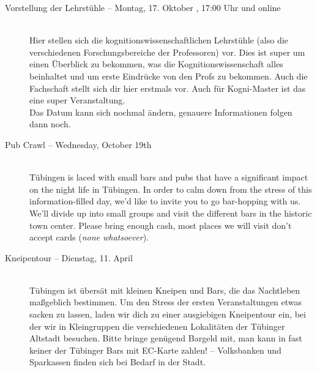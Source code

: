 \begin{description}

\ifkogwiss
	\item[Vorstellung der Lehrstühle -- Montag, 17. Oktober \YEAR, 17:00 Uhr und online]\ \\
	Hier stellen sich die kognitionswissenschaftlichen Lehrstühle (also die verschiedenen Forschungsbereiche der Professoren) vor. Dies ist super um einen Überblick zu bekommen, was die Kognitionswissenschaft alles beinhaltet und um erste Eindrücke von den Profs zu bekommen. Auch die Fachschaft stellt sich dir hier erstmals vor. %
	Auch für Kogni-Master ist das eine super Veranstaltung. \\
	Das Datum kann sich nochmal ändern, genauere Informationen folgen dann noch.
\fi

\ifml
	\item[Pub Crawl -- Wednesday, October 19th \YEAR]~\\%
	Tübingen is laced with small bars and pubs that have a significant impact on the night life in Tübingen.
	In order to calm down from the stress of this information-filled day, we'd like to invite you to go bar-hopping with us.
	We'll divide up into small groups and visit the different bars in the historic town center.
	Please bring enough cash, most places we will visit don't accept cards (\emph{none whatsoever}).
\else
	\item[Kneipentour -- Dienstag, 11. April \YEAR]~\\%
	Tübingen ist übersät mit kleinen Kneipen und Bars, die das Nachtleben maßgeblich bestimmen.
	Um den Stress der ersten Veranstaltungen etwas sacken zu lassen, laden wir dich zu einer ausgiebigen Kneipentour ein,
	bei der wir in Kleingruppen die verschiedenen Lokalitäten der Tübinger Altstadt besuchen.
	Bitte bringe genügend Bargeld mit, man kann in fast keiner der Tübinger Bars mit EC-Karte zahlen! -- Volksbanken und Sparkassen finden sich bei Bedarf in der Stadt.
\fi


\end{description}

